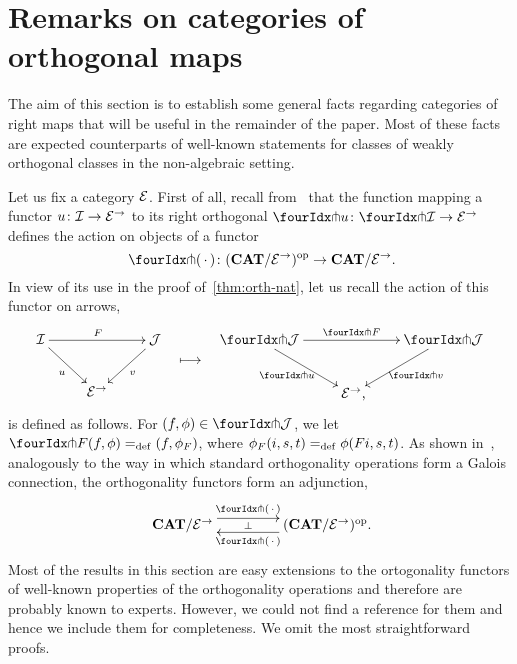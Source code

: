 \documentclass[reqno,10pt,a4paper,oneside,draft]{amsart}
\begin{document}
\section{Remarks on categories of orthogonal maps}
\label{sec:ortf}

The aim of this section is to establish some general facts regarding categories of right maps that will be useful in the remainder of the paper.
Most of these facts are expected counterparts of well-known statements for classes of weakly orthogonal classes in the non-algebraic setting.

Let us fix a category $\mathcal{E}$.
First of all, recall from~\cite{garner:small-object-argument} that the function mapping a functor $u \colon \mathcal{I} \to \mathcal{E}^\to$ to its right orthogonal $\liftr{u} \co \liftr{\cal{I}} \to \catE^\to$ defines the action on objects of a functor
\[
  \liftr{\brarghole} \co (\CAT/\catE^\to)^{\op} \to \CAT/\catE^\to \rlap{.}
\]
In view of its use in the proof of~\cref{thm:orth-nat}, let us recall the action of this functor on arrows,
\begin{align*}
\xymatrix{
  \cal{I} \ar[dr]_u \ar[rr]^F & & \cal{J} \ar[dl]^{v} \\
  & \catE^\to
}
&&
\xymatrix{
  \ar@{}[d]|{\textstyle\longmapsto} \\
  {}
}
&&
\xymatrix{
  \liftr{\cal{J}} \ar[dr]_{\liftr{u}} \ar[rr]^{\liftr{F}} & & \liftr{\cal{J}} \ar[dl]^{\liftr{v}} \\
  & \catE^\to \rlap{,}
}
\end{align*}
is defined as follows.
For $(f, \phi) \in \liftr{\cal{J}}$, we let $\liftr{F}(f,\phi) \defeq (f, \phi_F)$, where $\phi_F(i, s, t) =_{\operatorname{def}} \phi(Fi, s, t)$.
As shown in~\cite[Proposition~3.8]{garner:small-object-argument}, analogously to the way in which standard orthogonality operations form a Galois connection, the orthogonality functors form an adjunction,
\begin{equation} \label{garner-adjunction}
\begin{gathered}
\xymatrix@C+2em{
  \CAT/\catE^\to
  \ar@<5pt>[r]^-{\liftl{\brarghole}}
  \ar@{}[r]|-{\bot}
&
  (\CAT/\catE^\to)^{\op} \rlap{.}
  \ar@<5pt>[l]^-{\liftr{\brarghole}}
}
\end{gathered}
\end{equation}
Most of the results in this section are easy extensions to the ortogonality functors of well-known properties of the orthogonality operations and therefore are probably known to experts.
However, we could not find a reference for them and hence we include them for completeness.
We omit the most straightforward proofs.
\end{document}
